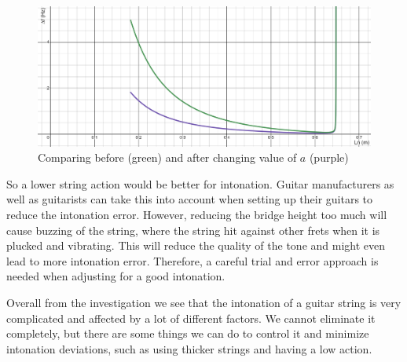 \begin{figure}[!h]
    \includegraphics[width = \textwidth]{./ee/compare_graph_a.png}
    \caption{Comparing before (green) and after changing value of $a$ (purple)} \label{fig13}
\end{figure}
So a lower string action would be better for intonation. Guitar manufacturers as well as guitarists can take this into account when setting up their guitars to reduce the intonation error. However, reducing the bridge height too much will cause buzzing of the string, where the string hit against other frets when it is plucked and vibrating. This will reduce the quality of the tone and might even lead to more intonation error. Therefore, a careful trial and error approach is needed when adjusting for a good intonation. \par
Overall from the investigation we see that the intonation of a guitar string is very complicated and affected by a lot of different factors. We cannot eliminate it completely, but there are some things we can do to control it and minimize intonation deviations, such as using thicker strings and having a low action.